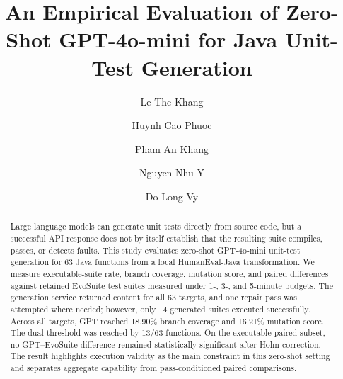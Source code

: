 \documentclass{llncs}
\begin{document}
\pagestyle{plain}
\raggedbottom

\title{An Empirical Evaluation of Zero-Shot GPT-4o-mini for Java Unit-Test Generation}

\author{Le The Khang \and Huynh Cao Phuoc \and Pham An Khang \and Nguyen Nhu Y \and Do Long Vy}

\maketitle
\thispagestyle{plain}

\begin{abstract}
Large language models can generate unit tests directly from source code, but a successful API response does not by itself establish that the resulting suite compiles, passes, or detects faults. This study evaluates zero-shot GPT-4o-mini unit-test generation for 63 Java functions from a local HumanEval-Java transformation. We measure executable-suite rate, branch coverage, mutation score, and paired differences against retained EvoSuite test suites measured under 1-, 3-, and 5-minute budgets. The generation service returned content for all 63 targets, and one repair pass was attempted where needed; however, only 14 generated suites executed successfully. Across all targets, GPT reached 18.90\% branch coverage and 16.21\% mutation score. The dual threshold was reached by 13/63 functions. On the executable paired subset, no GPT--EvoSuite difference remained statistically significant after Holm correction. The result highlights execution validity as the main constraint in this zero-shot setting and separates aggregate capability from pass-conditioned paired comparisons.

\end{abstract}











\end{document}
